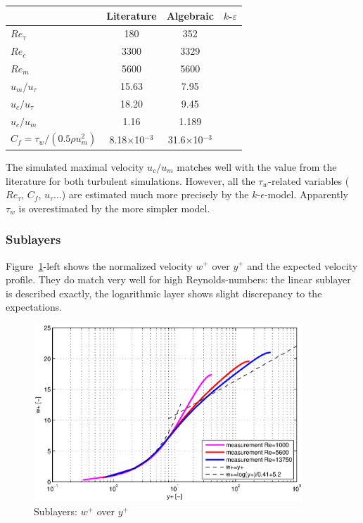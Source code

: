\begin{center}
\begin{tabular}{|l|c|c|c|}
\hline
 & Literature & Algebraic & $k$-$\varepsilon$ \\\hline
$Re_\tau$ & 180 & 352 &  \\\hline
$Re_c$ & 3300 & 3329 &   \\\hline
$Re_m$ & 5600 & 5600 &  \\\hline
$u_m/u_\tau$ & 15.63 & 7.95 &  \\\hline
$u_c/u_\tau$ & 18.20 & 9.45 &  \\\hline
$u_c/u_m$ & 1.16 & 1.189 &  \\\hline
$C_f = \tau_w / (0.5 \rho u_m^2)$ & 8.18$\times$10$^{-3}$ & 31.6$\times$10$^{-3}$ &  \\\hline
\end{tabular}
\end{center}

\noindent The simulated maximal velocity $u_c/u_m$ matches well with the value from the literature for both turbulent simulations. However, all the $\tau_w$-related variables ($Re_\tau$, $C_f$, $u_\tau$...) are estimated much more precisely by the $k$-$\epsilon$-model. Apparently $\tau_w$  is overestimated by the more simpler model.

\subsubsection{Sublayers}

Figure~\ref{fig:sublayers_y+}-left shows the normalized velocity $w^+$  over $y^+$ and the expected velocity profile. They do match very well for high Reynolds-numbers: the linear sublayer is described exactly, the logarithmic layer shows slight discrepancy to the expectations.

\begin{figure}[!htb]
\centering
\includegraphics[width=0.9\textwidth]{FIGURES/wplusyplus.eps}
\caption{Sublayers: $w^+$ over $y^+$}
\label{fig:sublayers_y+}
\end{figure} 

